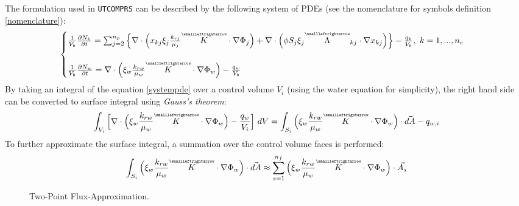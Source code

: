 The formulation used in \texttt{UTCOMPRS} can be described by the following system of PDEs\supercite{phdfernandes} (see the nomenclature for symbols definition \ref{nomenclature}):
\begingroup\makeatletter\def\f@size{12}\check@mathfonts
\begin{equation}
	\begin{cases}
		\frac{1}{V_{b}} \frac{\partial N_{k}}{\partial t} = \sum_{j=2}^{n_{p}}\Big\{\nabla \cdot\Big( x_{kj}\xi_{j}\frac{k_{rj}}{\mu_{j}}\tensor{K}\cdot\nabla\Phi_{j}\Big) + \nabla \cdot \Big(\phi S_{j}\xi_{j}\tensor{\Lambda}_{kj}\cdot\nabla x_{kj}\Big)\Big\} - \frac{q_{k}}{V_{b}}, \ k=1,...,n_{c}\\\\
		\frac{1}{V_{b}} \frac{\partial N_{w}}{\partial t} = \nabla \cdot \Big(\xi_{w}\frac{k_{rw}}{\mu_{w}}\tensor{K}\cdot \nabla\Phi_{w}\Big) - \frac{q_{w}}{V_{b}}
	\end{cases}
\label{systempde}
\end{equation}\endgroup
By taking an integral of the equation \ref{systempde} over a control volume $V_{i}$ (using the water equation for simplicity), the right hand side can be converted to surface integral using \textit{Gauss's theorem}:
\begin{equation}
\int_{V_{i}}\Big[\nabla \cdot \Big(\xi_{w}\frac{k_{rw}}{\mu_{w}}\tensor{K}\cdot \nabla\Phi_{w}\Big) - \frac{q_{w}}{V_{i}}\Big] \ dV = \int_{S_{i}}\Big(\xi_{w}\frac{k_{rw}}{\mu_{w}}\tensor{K}\cdot \nabla\Phi_{w}\Big)\cdot \vec{dA} - q_{w,i}
\end{equation}
To further approximate the surface integral, a summation over the control volume faces is performed:
\begin{equation}
\int_{S_{i}}\Big(\xi_{w}\frac{k_{rw}}{\mu_{w}}\tensor{K}\cdot \nabla\Phi_{w}\Big)\cdot \vec{dA} \approx \sum_{s=1}^{n_{f}} \Big(\xi_{w}\frac{k_{rw}}{\mu_{w}}\tensor{K}\cdot \nabla\Phi_{w}\Big)\cdot\vec{A_{s}}
\label{surface}
\end{equation}

\begin{figure}[htb]
\raggedright
\resizebox{13cm}{!}{}
\caption{Two-Point Flux-Approximation.}\label{tpfa-tikz}
\end{figure}

